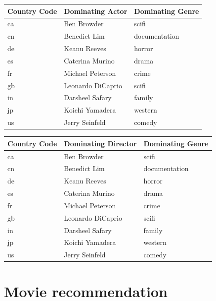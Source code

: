 \documentclass[11pt,preprint, authoryear]{elsarticle}
\let\origtable\table
\let\endorigtable\endtable
\renewenvironment{table}[1][2] {
    \expandafter\origtable\expandafter[H]
} {
    \endorigtable
}
\numberwithin{equation}{section}
\numberwithin{figure}{section}
\numberwithin{table}{section}
\begin{document}
\begin{table}
\begin{table}

\caption{\label{tab:unnamed-chunk-4}Dominant Actors}
\centering
\begin{tabular}[t]{l|l|l}
\hline
Country Code & Dominating Actor & Dominating Genre\\
\hline
ca & Ben Browder & scifi\\
\hline
cn & Benedict Lim & documentation\\
\hline
de & Keanu Reeves & horror\\
\hline
es & Caterina Murino & drama\\
\hline
fr & Michael Peterson & crime\\
\hline
gb & Leonardo DiCaprio & scifi\\
\hline
in & Darsheel Safary & family\\
\hline
jp & Koichi Yamadera & western\\
\hline
us & Jerry Seinfeld & comedy\\
\hline
\end{tabular}
\end{table}\begin{table}

\caption{\label{tab:unnamed-chunk-4}Dominant Directors}
\centering
\begin{tabular}[t]{l|l|l}
\hline
Country Code & Dominating Director & Dominating Genre\\
\hline
ca & Ben Browder & scifi\\
\hline
cn & Benedict Lim & documentation\\
\hline
de & Keanu Reeves & horror\\
\hline
es & Caterina Murino & drama\\
\hline
fr & Michael Peterson & crime\\
\hline
gb & Leonardo DiCaprio & scifi\\
\hline
in & Darsheel Safary & family\\
\hline
jp & Koichi Yamadera & western\\
\hline
us & Jerry Seinfeld & comedy\\
\hline
\end{tabular}
\end{table}
\end{table}

\hypertarget{movie-recommendation}{%
\section{Movie recommendation}\label{movie-recommendation}}
\end{document}
